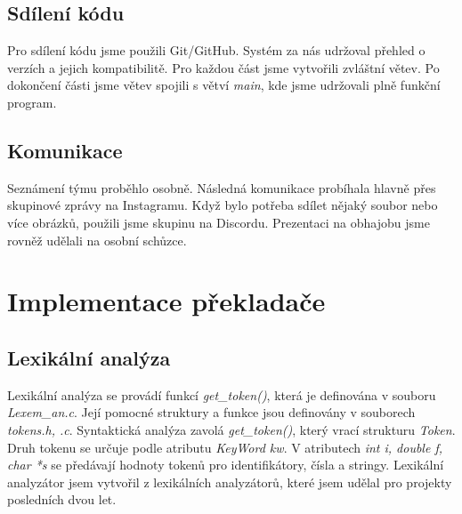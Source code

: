 \documentclass[a4paper, 12pt]{article}
\begin{document}
\subsection{Sdílení kódu}
Pro sdílení kódu jsme použili Git/GitHub. Systém za nás udržoval přehled o verzích a jejich kompatibilitě. Pro každou část jsme vytvořili zvláštní větev. Po dokončení části jsme větev spojili s větví \textit{main}, kde jsme udržovali plně funkční program.
\subsection{Komunikace}
Seznámení týmu proběhlo osobně. Následná komunikace probíhala hlavně přes skupinové zprávy na Instagramu. Když bylo potřeba sdílet nějaký soubor nebo více obrázků, použili jsme skupinu na Discordu. Prezentaci na obhajobu jsme rovněž udělali na osobní schůzce.

\newpage
{}
\section{Implementace překladače}
\subsection{Lexikální analýza}
Lexikální analýza se provádí funkcí \textit{get\_token()}, která je definována v souboru \textit{Lexem\_an.c}. Její pomocné struktury a funkce jsou definovány v souborech \textit{tokens.h, .c}.\newline
Syntaktická analýza zavolá \textit{get\_token()}, který vrací strukturu \textit{Token}. Druh tokenu se určuje podle atributu \textit{KeyWord kw}. V atributech \textit{int i, double f, char *s} se předávají hodnoty tokenů pro identifikátory, čísla a stringy.\newline
Lexikální analyzátor jsem vytvořil z lexikálních analyzátorů, které jsem udělal pro projekty posledních dvou let.
\end{document}
